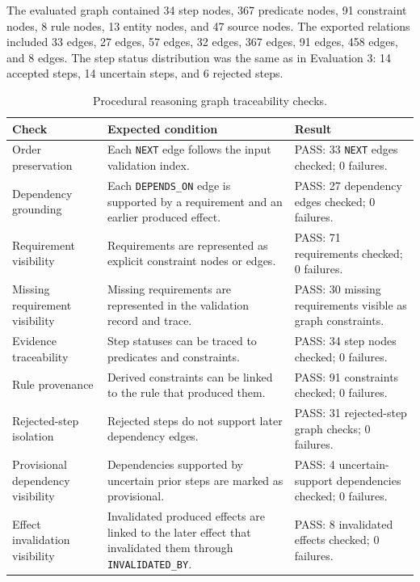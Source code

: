 The evaluated graph contained 34 step nodes, 367 predicate nodes, 91 constraint
nodes, 8 rule nodes, 13 entity nodes, and 47 source nodes. The exported relations
included 33  edges, 27  edges, 57
 edges, 32  edges, 367 
edges, 91  edges, 458  edges, and
8  edges. The step status distribution was the
same as in Evaluation 3: 14 accepted steps, 14 uncertain steps, and 6 rejected
steps.

\begin{table}[htbp]
\centering
\caption{Procedural reasoning graph traceability checks.}
\label{tab:evaluation-graph-traceability}
\small
\begin{tabular}{p{} p{} p{}}
\toprule
Check & Expected condition & Result \\
\midrule
Order preservation &
Each \texttt{NEXT} edge follows the input validation index. &
PASS: 33 \texttt{NEXT} edges checked; 0 failures. \\

Dependency grounding &
Each \texttt{DEPENDS\_ON} edge is supported by a requirement and an earlier produced effect. &
PASS: 27 dependency edges checked; 0 failures. \\

Requirement visibility &
Requirements are represented as explicit constraint nodes or edges. &
PASS: 71 requirements checked; 0 failures. \\

Missing requirement visibility &
Missing requirements are represented in the validation record and trace. &
PASS: 30 missing requirements visible as graph constraints. \\

Evidence traceability &
Step statuses can be traced to predicates and constraints. &
PASS: 34 step nodes checked; 0 failures. \\

Rule provenance &
Derived constraints can be linked to the rule that produced them. &
PASS: 91 constraints checked; 0 failures. \\

Rejected-step isolation &
Rejected steps do not support later dependency edges. &
PASS: 31 rejected-step graph checks; 0 failures. \\

Provisional dependency visibility &
Dependencies supported by uncertain prior steps are marked as provisional. &
PASS: 4 uncertain-support dependencies checked; 0 failures. \\

Effect invalidation visibility &
Invalidated produced effects are linked to the later effect that invalidated them through \texttt{INVALIDATED\_BY}. &
PASS: 8 invalidated effects checked; 0 failures. \\
\bottomrule
\end{tabular}
\end{table}

